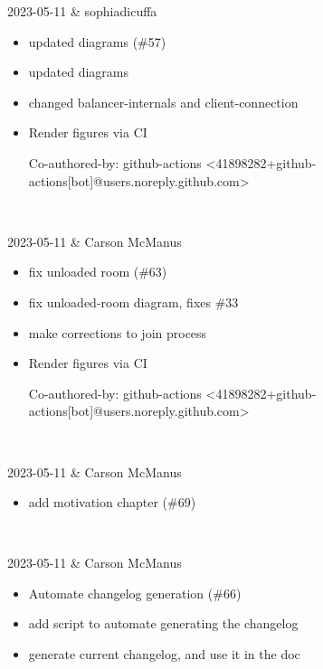 2023-05-11 & sophiadicuffa
\begin{itemize}[topsep=0pt,itemsep=0pt,parsep=0pt,partopsep=0pt,leftmargin=12pt]
\item updated diagrams (\#57)

\item updated diagrams
\item changed balancer-internals and client-connection

\item Render figures via CI



Co-authored-by: github-actions <41898282+github-actions[bot]@users.noreply.github.com>
\end{itemize}
\\ \hline

2023-05-11 & Carson McManus
\begin{itemize}[topsep=0pt,itemsep=0pt,parsep=0pt,partopsep=0pt,leftmargin=12pt]
\item fix unloaded room (\#63)

\item fix unloaded-room diagram, fixes \#33

\item make corrections to join process

\item Render figures via CI



Co-authored-by: github-actions <41898282+github-actions[bot]@users.noreply.github.com>
\end{itemize}
\\ \hline

2023-05-11 & Carson McManus
\begin{itemize}[topsep=0pt,itemsep=0pt,parsep=0pt,partopsep=0pt,leftmargin=12pt]
\item add motivation chapter (\#69)


\end{itemize}
\\ \hline

2023-05-11 & Carson McManus
\begin{itemize}[topsep=0pt,itemsep=0pt,parsep=0pt,partopsep=0pt,leftmargin=12pt]
\item Automate changelog generation (\#66)

\item add script to automate generating the changelog

\item generate current changelog, and use it in the doc
\end{itemize}
\\ \hline

